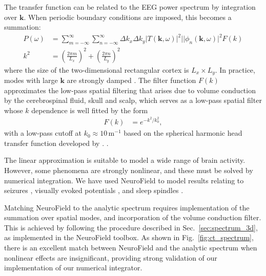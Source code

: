 \documentclass[preprint,review,10pt,authoryear,letterpaper]{elsarticle}
\begin{document}
The transfer function can be related to the EEG power spectrum by integration over $\mathbf{k}$. When periodic boundary conditions are imposed, this becomes a summation:
\begin{align}
\label{eqn:power_sum}
P(\omega) &= \sum_{m = -\infty}^{\infty}\sum_{n = -\infty}^{\infty} \Delta k_x \Delta k_y |T(\mathbf{k},\omega)|^2||\phi_n(\mathbf{k},\omega)|^2F(k)\\
k^2 &=  \left( \frac{2\pi m}{L_x} \right)^2 + \left( \frac{2\pi n}{L_y}\right)^2 
\end{align}
where the size of the two-dimensional rectangular cortex is $L_x \times L_y$. In practice, modes with large $\mathbf{k}$ are strongly damped \citep{OConnor2002}. The filter function $F(k)$ approximates the low-pass spatial filtering that arises due to volume conduction by the cerebrospinal fluid, skull and scalp, which serves as a low-pass spatial filter whose $k$ dependence is well fitted by the form \citep{PhysRevE.63.021903,Rowe2004413,alb06a,VanAlbada2010}
\begin{align}
F(k) &= e^{-k^2/k_0^2},
\end{align}
with a low-pass cutoff at $k_0 \approx 10$\,m$^{-1}$ based on the spherical harmonic head transfer function developed by \cite{Srinivasan1998}. . 

The linear approximation is suitable to model a wide range of brain activity. However, some phenomena are strongly nonlinear, and these must be solved by numerical integration. We have used NeuroField to model results relating to seizures \citep{Roberts2008}, visually evoked potentials \citep{Roberts2012a}, and sleep spindles \citep{Abeysuriya2013,Abeysuriya2013a}. 

Matching NeuroField to the analytic spectrum requires implementation of the summation over spatial modes, and incorporation of the volume conduction filter. This is achieved by following the procedure described in Sec.~\ref{sec:spectrum_3d}, as implemented in the NeuroField toolbox. As shown in Fig.~\ref{fig:ct_spectrum}, there is an excellent match between NeuroField and the analytic spectrum when nonlinear effects are insignificant, providing strong validation of our implementation of our numerical integrator. 
\end{document}
